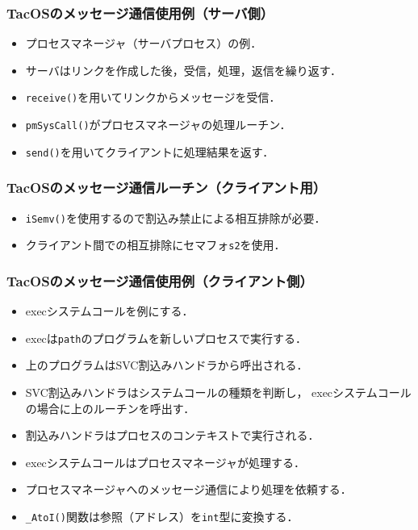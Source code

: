 \documentclass{beamer}                   %
\begin{document}
\begin{frame}
  \frametitle{TacOSのメッセージ通信使用例（サーバ側）}
  \begin{itemize}
  \item プロセスマネージャ（サーバプロセス）の例．
  \item サーバはリンクを作成した後，受信，処理，返信を繰り返す．
  \item {\tt receive()}を用いてリンクからメッセージを受信．
  \item {\tt pmSysCall()}がプロセスマネージャの処理ルーチン．
  \item {\tt send()}を用いてクライアントに処理結果を返す．
  \end{itemize}
\end{frame}

\begin{frame}
  \frametitle{TacOSのメッセージ通信ルーチン（クライアント用）}
  \begin{itemize}
  \item {\tt iSemv()}を使用するので割込み禁止による相互排除が必要．
  \item クライアント間での相互排除にセマフォ{\tt s2}を使用．
  \end{itemize}
\end{frame}

\begin{frame}
  \frametitle{TacOSのメッセージ通信使用例（クライアント側）}
  \begin{itemize}
  \item execシステムコールを例にする．
  \item execは{\tt path}のプログラムを新しいプロセスで実行する．
  \item 上のプログラムはSVC割込みハンドラから呼出される．
  \item SVC割込みハンドラはシステムコールの種類を判断し，
    execシステムコールの場合に上のルーチンを呼出す．
  \item 割込みハンドラはプロセスのコンテキストで実行される．
  \item execシステムコールはプロセスマネージャが処理する．
  \item プロセスマネージャへのメッセージ通信により処理を依頼する．
  \item {\tt \_AtoI()}関数は参照（アドレス）を{\tt int}型に変換する．
  \end{itemize}
\end{frame}
\end{document}
